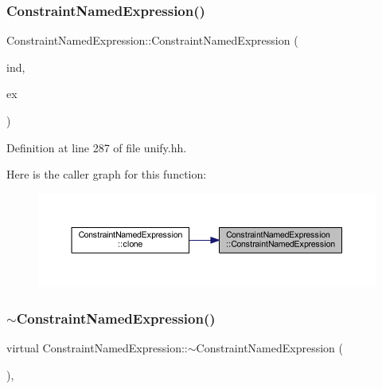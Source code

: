 \subsubsection{\texorpdfstring{ConstraintNamedExpression()}{ConstraintNamedExpression()}}
{\footnotesize\ttfamily Constraint\+Named\+Expression\+::\+Constraint\+Named\+Expression (\begin{DoxyParamCaption}\item[{int4}]{ind,  }\item[{\mbox{\hyperlink{class_r_h_s_constant}{R\+H\+S\+Constant}} $\ast$}]{ex }\end{DoxyParamCaption})\hspace{0.3cm}{\ttfamily [inline]}}



Definition at line 287 of file unify.\+hh.

Here is the caller graph for this function\+:
\nopagebreak
\begin{figure}[H]
\begin{center}
\leavevmode
\includegraphics[width=350pt]{class_constraint_named_expression_a47c220db961ffdd0dacce011f26ab095_icgraph}
\end{center}
\end{figure}
\mbox{\label{class_constraint_named_expression_a1b2cba56c9c5c40c16124c85460a8dcf}} 
\subsubsection{\texorpdfstring{$\sim$ConstraintNamedExpression()}{~ConstraintNamedExpression()}}
{\footnotesize\ttfamily virtual Constraint\+Named\+Expression\+::$\sim$\+Constraint\+Named\+Expression (\begin{DoxyParamCaption}\item[{void}]{ }\end{DoxyParamCaption})\hspace{0.3cm}{\ttfamily [inline]}, {\ttfamily [virtual]}}



